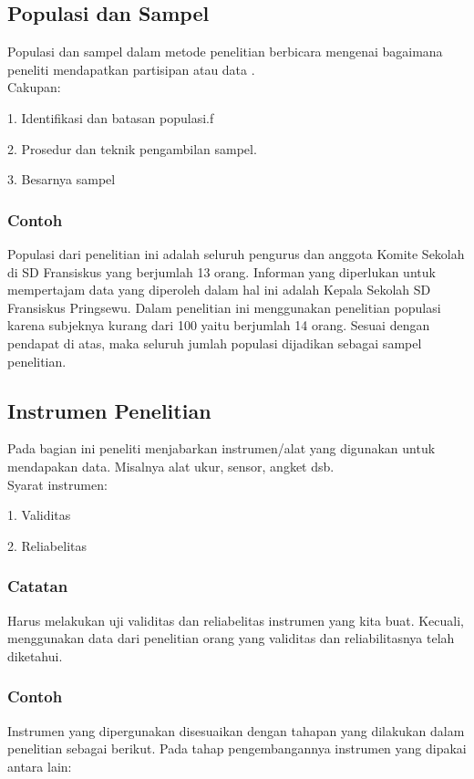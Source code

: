 \documentclass[10pt]{IEEEtran}
\begin{document}
\subsection{Populasi dan Sampel}
Populasi dan sampel dalam metode penelitian berbicara mengenai bagaimana peneliti mendapatkan partisipan atau data \cite{youtube:1}. \\
Cakupan:

1. Identifikasi dan batasan populasi.f

2. Prosedur dan teknik pengambilan sampel.

3. Besarnya sampel

\subsubsection*{Contoh}
Populasi dari
penelitian ini adalah seluruh pengurus dan anggota Komite Sekolah di
SD Fransiskus yang berjumlah 13 orang. Informan yang diperlukan
untuk mempertajam data yang diperoleh dalam hal ini adalah Kepala
Sekolah SD Fransiskus Pringsewu.
Dalam penelitian ini menggunakan
penelitian populasi karena subjeknya kurang dari 100 yaitu berjumlah 14
orang. Sesuai dengan pendapat di atas, maka seluruh jumlah populasi
dijadikan sebagai sampel penelitian\cite{unila:2}.


\subsection{Instrumen Penelitian}
Pada bagian ini peneliti menjabarkan instrumen/alat yang digunakan untuk mendapakan data. Misalnya alat ukur, sensor, angket dsb\cite{youtube:1}.
\\
Syarat instrumen:

1. Validitas

2. Reliabelitas
\subsubsection*{Catatan} Harus melakukan uji validitas dan reliabelitas instrumen yang kita buat. Kecuali, menggunakan data dari penelitian orang yang validitas dan reliabilitasnya telah diketahui\cite{youtube:1}.

\subsubsection*{Contoh}
Instrumen yang dipergunakan disesuaikan dengan tahapan yang dilakukan
dalam penelitian sebagai berikut\cite{unila:2}.
Pada tahap pengembangannya instrumen yang dipakai antara lain:
\end{document}
